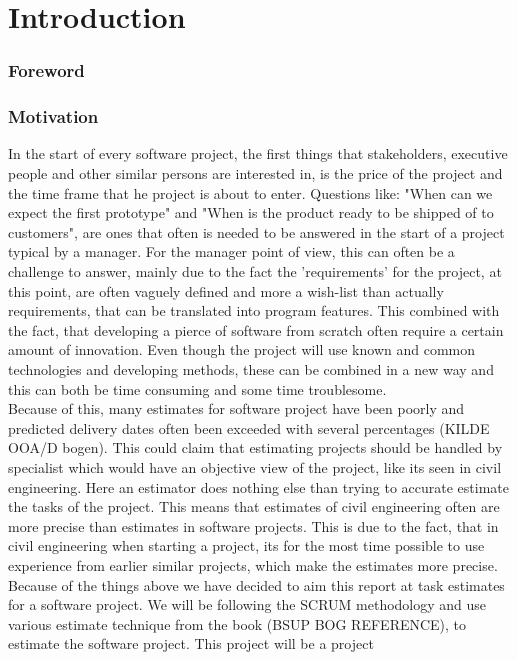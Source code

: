 \part{Introduction}
\section{Foreword}
\section{Motivation}
In the start of every software project, the first things that stakeholders, executive people and other similar persons are interested in, is the price of the project and the time frame that he project is about to enter. Questions like: "When can we expect the first prototype" and "When is the product ready to be shipped of to customers", are  ones that often is needed to be answered in the start of a project typical by a manager. For the manager point of view, this can often be a challenge to answer, mainly due to the fact the 'requirements' for the project, at this point, are often vaguely defined and more a wish-list than actually requirements, that can be translated into program features. This combined with the fact, that developing a pierce of software from scratch often require a certain amount of innovation. Even though the project  will use known and common technologies and developing methods, these can be combined in a new way and this can both be time consuming and some time troublesome. \\
Because of this, many estimates for software project have been poorly and predicted delivery dates often been exceeded with several percentages (KILDE OOA/D bogen). This could claim that estimating projects should be handled by specialist which would have an objective view of the project, like its seen in civil engineering. Here an estimator does nothing else than trying to accurate estimate the tasks of the project. This means that estimates of civil engineering often are more precise than estimates in software projects. This is due to the fact, that in civil engineering when starting a project, its for the most time possible to use experience from earlier similar projects, which make the estimates more precise. \\
Because of the things above we have decided to aim this report at task estimates for a software project. We will be following the SCRUM methodology and use various estimate technique from the book (BSUP BOG REFERENCE), to estimate the software project. This project will be a project 